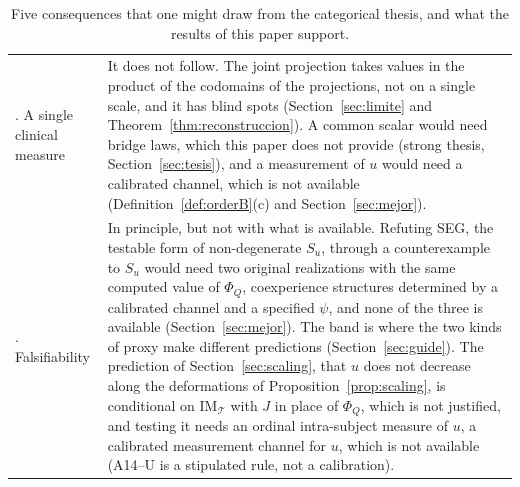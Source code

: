 \begin{table}[htbp]
\begin{tabular}{>{\raggedright\arraybackslash}p{}>{\raggedright\arraybackslash}p{}}
4. A single clinical measure & It does not follow. The joint projection takes values in the product of the codomains of the projections, not on a single scale, and it has blind spots (Section~\ref{sec:limite} and Theorem~\ref{thm:reconstruccion}). A common scalar would need bridge laws, which this paper does not provide (strong thesis, Section~\ref{sec:tesis}), and a measurement of $u$ would need a calibrated channel, which is not available (Definition~\ref{def:orderB}(c) and Section~\ref{sec:mejor}).\\
5. Falsifiability & In principle, but not with what is available. Refuting SEG, the testable form of non-degenerate $S_u$, through a counterexample to $S_u$ would need two original realizations with the same computed value of $\Phi_Q$, coexperience structures determined by a calibrated channel and a specified $\psi$, and none of the three is available (Section~\ref{sec:mejor}). The band is where the two kinds of proxy make different predictions (Section~\ref{sec:guide}). The prediction of Section~\ref{sec:scaling}, that $u$ does not decrease along the deformations of Proposition~\ref{prop:scaling}, is conditional on $\mathrm{IM}_{\mathcal T}$ with $J$ in place of $\Phi_Q$, which is not justified, and testing it needs an ordinal intra-subject measure of $u$, a calibrated measurement channel for $u$, which is not available (A14--U is a stipulated rule, not a calibration).\\
\bottomrule
\end{tabular}
\caption{Five consequences that one might draw from the categorical thesis, and what the results of this paper support.}\label{tab:F-3}
\end{table}

